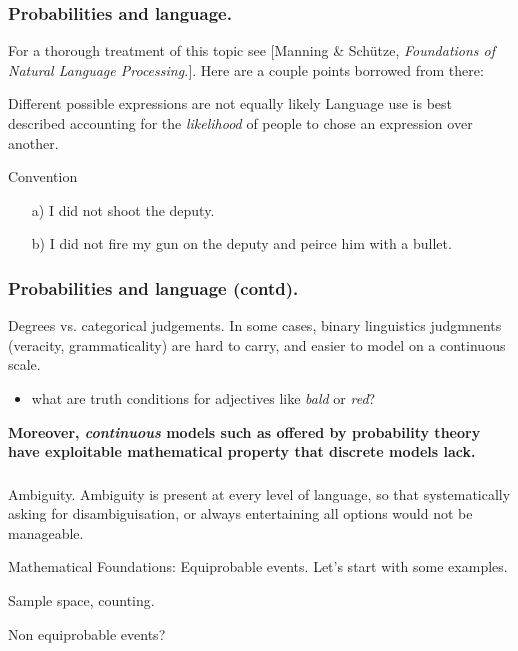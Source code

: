 \documentclass{beamer}
\begin{document}
\begin{frame}
  \frametitle{Probabilities and language.}
  For a thorough treatment of this topic see [Manning \& Sch\"utze, \emph{Foundations of Natural Language Processing.}]. Here are a couple points borrowed from there: 

  \begin{block}{Different possible expressions are not equally likely}
    Language use is best described accounting for the \emph{likelihood} of people to chose an expression over another.
  \end{block}

  \begin{exampleblock}{Convention}
    \begin{itemize}
    \item[a)] I did not shoot the deputy.
    \item[b)] I did not fire my gun on the deputy and peirce him with a bullet.
    \end{itemize}
  \end{exampleblock}
\end{frame}

\begin{frame}
  \frametitle{Probabilities and language (contd).}
  
  \begin{block}{Degrees vs. categorical judgements.}
    In some cases, binary linguistics judgmnents (veracity, grammaticality) are hard to carry, and easier to model on a continuous scale.
    \begin{itemize}
    \item what are truth conditions for adjectives like \emph{bald} or \emph{red}?
    \end{itemize}
    {\bf Moreover, \emph{continuous} models such as offered by probability theory have exploitable mathematical property that discrete models lack.}
  \end{block}
\end{frame}

\begin{frame}
  \frametitle{}
  \begin{block}{Ambiguity.}
    Ambiguity is present at every level of language, so that systematically asking for disambiguisation, or always entertaining all options would not be manageable.
  \end{block}
\end{frame}

\begin{frame}{Mathematical Foundations: Equiprobable events.}
  Let's start with some examples.
\end{frame}

\begin{frame}{Sample space, counting.}
\end{frame}

\begin{frame}{Non equiprobable events?}

\end{frame}
\end{document}

